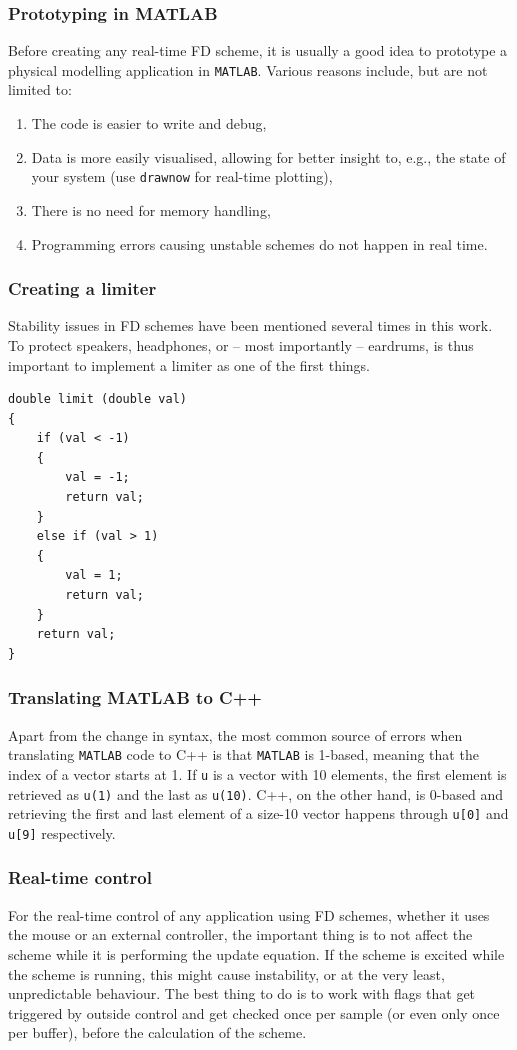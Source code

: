 \subsubsection{Prototyping in MATLAB}
Before creating any real-time FD scheme, it is usually a good idea to prototype a physical modelling application in \texttt{MATLAB}. Various reasons include, but are not limited to:
\begin{enumerate}
    \item The code is easier to write and debug,
    \item Data is more easily visualised, allowing for better insight to, e.g., the state of your system (use \texttt{drawnow} for real-time plotting),
    \item There is no need for memory handling,
    \item Programming errors causing unstable schemes do not happen in real time.
\end{enumerate}

\subsubsection{Creating a limiter}
Stability issues in FD schemes have been mentioned several times in this work. To protect speakers, headphones, or -- most importantly -- eardrums, is thus important to implement a limiter as one of the first things. 

\setlstCpp
\begin{lstlisting}
double limit (double val)
{
    if (val < -1)
    {
        val = -1;
        return val;
    }
    else if (val > 1)
    {
        val = 1;
        return val;
    }
    return val;
}
\end{lstlisting}

\subsubsection{Translating MATLAB to C++}
Apart from the change in syntax, the most common source of errors when translating \texttt{MATLAB} code to C++ is that \texttt{MATLAB} is 1-based, meaning that the index of a vector starts at 1. If \texttt{u} is a vector with 10 elements, the first element is retrieved as \texttt{u(1)} and the last as \texttt{u(10)}. C++, on the other hand, is 0-based and retrieving the first and last element of a size-10 vector happens through \texttt{u[0]} and \texttt{u[9]} respectively. 

\subsubsection{Real-time control}
For the real-time control of any application using FD schemes, whether it uses the mouse or an external controller, the important thing is to not affect the scheme while it is performing the update equation. If the scheme is excited while the scheme is running, this might cause instability, or at the very least, unpredictable behaviour. The best thing to do is to work with flags that get triggered by outside control and get checked once per sample (or even only once per buffer), before the calculation of the scheme.


